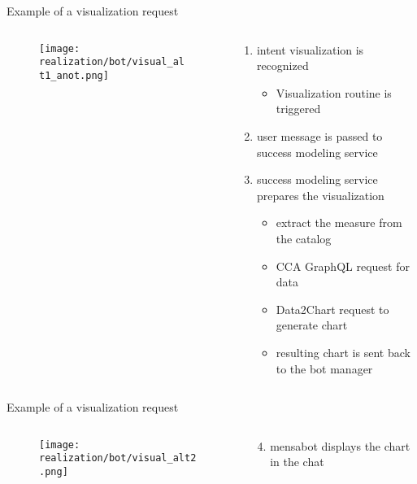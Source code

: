 \begin{frame}{Example of a visualization request}
    
    \begin{columns}
        \begin{column}[t]{0.5\textwidth}
            \begin{figure}
               
                \texttt{[image: realization/bot/visual\_alt1\_anot.png]} 
            \end{figure}
        \end{column}
        \begin{column}[t]{0.5\textwidth}
            \begin{enumerate}
              \item intent visualization is recognized
              \begin{itemize}
                \item Visualization routine is triggered
              \end{itemize}
              \item user message is passed to success modeling service
            \item success modeling service prepares the visualization
            \begin{itemize}
              \item extract the measure from the catalog
              \item CCA GraphQL request for data
              \item Data2Chart request to generate chart
              \item resulting chart is sent back to the bot manager
            \end{itemize}
            \end{enumerate}
        \end{column}
    \end{columns}
\end{frame}

\begin{frame}{Example of a visualization request}
  \begin{columns}
    \begin{column}[t]{0.5\textwidth}
      \begin{figure}
        \texttt{[image: realization/bot/visual\_alt2.png]} 
      \end{figure}
    \end{column}
    \begin{column}[]{0.5\textwidth}
      \begin{enumerate}
        \setcounter{enumi}{3}
        \item mensabot displays the chart in the chat
      \end{enumerate}
    \end{column}
  \end{columns}
\end{frame}

